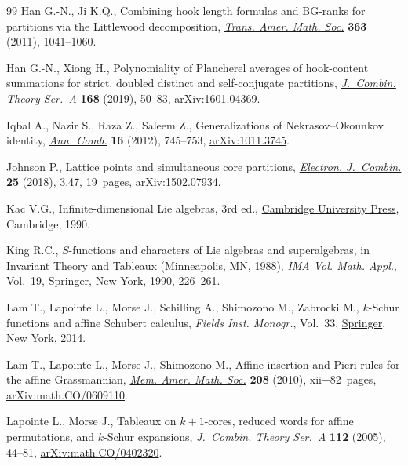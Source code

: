 \begin{thebibliography}{99}
Han G.-N., Ji K.Q., Combining hook length formulas and {BG}-ranks for partitions
 via the {L}ittlewood decomposition, \href{https://doi.org/10.1090/S0002-9947-2010-05191-8}{\textit{Trans. Amer. Math. Soc.}}
 \textbf{363} (2011), 1041--1060.

Han G.-N., Xiong H., Polynomiality of {P}lancherel averages of hook-content
 summations for strict, doubled distinct and self-conjugate partitions,
 \href{https://doi.org/10.1016/j.jcta.2019.05.012}{\textit{J.~Combin. Theory Ser.~A}} \textbf{168} (2019), 50--83,
 \href{https://arxiv.org/abs/1601.04369}{arXiv:1601.04369}.

Iqbal A., Nazir S., Raza Z., Saleem Z., Generalizations of
 {N}ekrasov--{O}kounkov identity, \href{https://doi.org/10.1007/s00026-012-0157-2}{\textit{Ann. Comb.}} \textbf{16} (2012),
 745--753, \href{https://arxiv.org/abs/1011.3745}{arXiv:1011.3745}.

Johnson P., Lattice points and simultaneous core partitions, \href{https://doi.org/10.37236/5734}{\textit{Electron.
 J.~Combin.}} \textbf{25} (2018), 3.47, 19~pages, \href{https://arxiv.org/abs/1502.07934}{arXiv:1502.07934}.

Kac V.G., Infinite-dimensional {L}ie algebras, 3rd ed., \href{https://doi.org/10.1017/CBO9780511626234}{Cambridge University
 Press}, Cambridge, 1990.

King R.C., {$S$}-functions and characters of {L}ie algebras and superalgebras,
 in Invariant Theory and Tableaux ({M}inneapolis, {MN}, 1988), \textit{IMA
 Vol. Math. Appl.}, Vol.~19, Springer, New York, 1990, 226--261.

Lam T., Lapointe L., Morse J., Schilling A., Shimozono M., Zabrocki M.,
 {$k$}-{S}chur functions and affine {S}chubert calculus, \textit{Fields Inst.
 Monogr.}, Vol.~33, \href{https://doi.org/10.1007/978-1-4939-0682-6}{Springer}, New York, 2014.

Lam T., Lapointe L., Morse J., Shimozono M., Affine insertion and {P}ieri rules
 for the affine {G}rassmannian, \href{https://doi.org/10.1090/S0065-9266-10-00576-4}{\textit{Mem. Amer. Math. Soc.}} \textbf{208}
 (2010), xii+82~pages, \href{https://arxiv.org/abs/math.CO/0609110}{arXiv:math.CO/0609110}.

Lapointe L., Morse J., Tableaux on {$k+1$}-cores, reduced words for affine
 permutations, and {$k$}-{S}chur expansions, \href{https://doi.org/10.1016/j.jcta.2005.01.003}{\textit{J.~Combin. Theory Ser.~A}}
 \textbf{112} (2005), 44--81, \href{https://arxiv.org/abs/math.CO/0402320}{arXiv:math.CO/0402320}.


\end{thebibliography}

